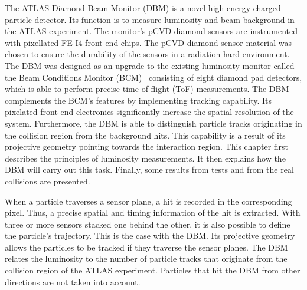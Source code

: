 \documentclass[12pt]{packages/mytustyle}  %
\begin{document}
The ATLAS Diamond Beam Monitor (DBM) is a novel high energy charged particle detector. Its function is to measure luminosity and beam background in the ATLAS experiment. The monitor's pCVD diamond sensors are instrumented with pixellated FE-I4 front-end chips. The pCVD diamond sensor material was chosen to ensure the durability of the sensors in a radiation-hard environment. The DBM was designed as an upgrade to the existing luminosity monitor called the Beam Conditions Monitor (BCM)~\cite{} consisting of eight diamond pad detectors, which is able to perform precise time-of-flight (ToF) measurements. The DBM complements the BCM's features by implementing tracking capability. Its pixelated front-end electronics significantly increase the spatial resolution of the system. Furthermore, the DBM is able to distinguish particle tracks originating in the collision region from the background hits. This capability is a result of its projective geometry pointing towards the interaction region. This chapter first describes the principles of luminosity measurements. It then explains how the DBM will carry out this task. Finally, some results from tests and from the real collisions are presented. 

When a particle traverses a sensor plane, a hit is recorded in the corresponding pixel. Thus, a precise spatial and timing information of the hit is extracted. With three or more sensors stacked one behind the other, it is also possible to define the particle's trajectory. This is the case with the DBM. Its projective geometry allows the particles to be tracked if they traverse the sensor planes. The DBM relates the luminosity to the number of particle tracks that originate from the collision region of the ATLAS experiment. Particles that hit the DBM from other directions are not taken into account.
\end{document}
